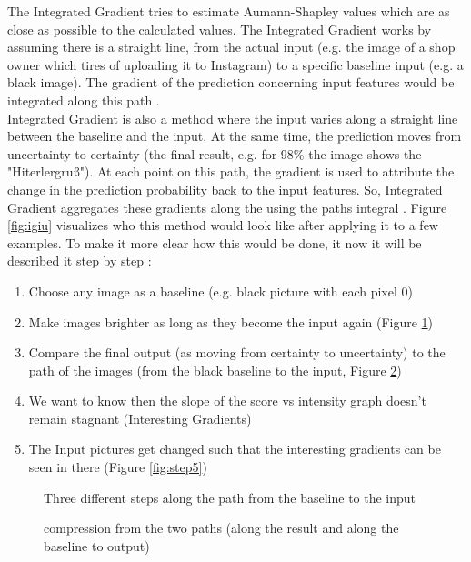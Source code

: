 The Integrated Gradient tries to estimate Aumann-Shapley values which are as close as possible to the calculated values. The Integrated Gradient works by assuming there is a straight line, from the actual input (e.g. the image of a shop owner which tires of uploading it to Instagram) to a specific baseline input (e.g. a black image). The gradient of the prediction concerning input features would be integrated along this path \cite{Mukund}.\\
Integrated Gradient is also a method where the input varies along a straight line between the baseline and the input. At the same time, the prediction moves from uncertainty to certainty (the final result, e.g. for 98\% the image shows the "Hiterlergruß"). At each\label{key} point on this path, the gradient is used to attribute the change in the prediction probability back to the input features. So, Integrated Gradient aggregates these gradients along the using the paths integral \cite{mudrakarta-etal-2018-model}.
Figure \ref{fig:igiu} visualizes who this method would look like after applying it to a few examples. To make it more clear how this would be done, it now it will be described it step by step :

\begin{enumerate}
	\item Choose any image as a baseline (e.g. black picture with each pixel 0) 
	\item Make images brighter as long as they become the input again  (Figure \ref{fig:step2})
	\item Compare the final output (as moving from certainty to uncertainty) to the path of the images (from the black baseline to the input, Figure \ref{fig:step3}) 
	\item We want to know then the slope of the score vs intensity graph doesn't remain stagnant (Interesting Gradients)
	\item The Input pictures get changed such that the interesting gradients can be seen in there (Figure \ref{fig:step5})
\end{enumerate}

\begin{figure}[!htp]
	\centering
	\caption{Three different steps along the path from the baseline to the input}
	\label{fig:step2}
\end{figure}

\begin{figure}[!htp]
	\centering
	\caption{compression from the two paths (along the result and along the baseline to output)}
	\label{fig:step3}
\end{figure}

